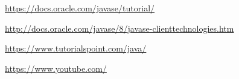 \begin{thebibliography}{99999}
\singlespace\normalsize

  \url{https://docs.oracle.com/javase/tutorial/}

  \url{http://docs.oracle.com/javase/8/javase-clienttechnologies.htm}

  \url{https://www.tutorialspoint.com/java/}

  \url{https://www.youtube.com/}

\end{thebibliography}
